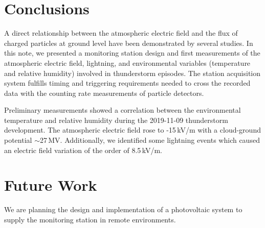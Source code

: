 \documentclass[letterpaper,12pt]{article}
\begin{document}
\section{Conclusions}

A direct relationship between the atmospheric electric field and the flux of charged particles at ground level have been demonstrated by several studies. In this note, we presented a monitoring station design and first measurements of the atmospheric electric field, lightning, and environmental variables (temperature and relative humidity) involved in thunderstorm episodes. The station acquisition system fulfills timing and triggering requirements needed to cross the recorded data with the counting rate measurements of particle detectors.

Preliminary measurements showed a correlation between the environmental temperature and relative humidity during the 2019-11-09 thunderstorm development. The atmospheric electric field rose to -15\,kV/m with a cloud-ground potential $\sim$27\,MV. Additionally, we identified some lightning events which caused an electric field variation of the order of 8.5\,kV/m.


\section{Future Work}
We are planning the design and implementation of a photovoltaic system to supply the monitoring station in remote environments. 





% 
\end{document}
